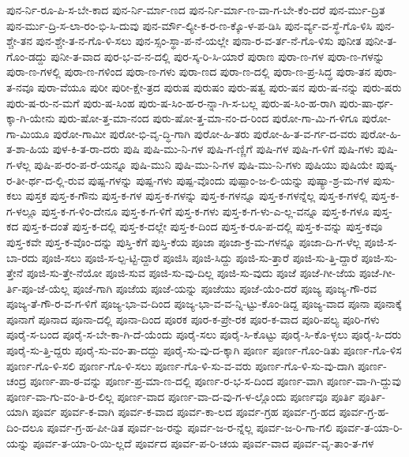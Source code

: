 {ಪುನ-ರ್ನಿ-ರೂ-ಪಿ-ಸ-ಬೇ-ಕಾದ
ಪುನ-ರ್ನಿ-ರ್ಮಾ-ಣದ
ಪುನ-ರ್ನಿ-ರ್ಮಾ-ಣ-ವಾ-ಗ-ಬೇ-ಕೆಂ-ದರೆ
ಪುನ-ರ್ಮು-ದ್ರಿತ
ಪುನ-ರ್ಮು-ದ್ರಿ-ಸ-ಲಾ-ರಂ-ಭಿ-ಸಿ-ದುವು
ಪುನ-ರ್ಮೌ-ಲ್ಯೀ-ಕ-ರ-ಣ-ಕ್ಕೊ-ಳ-ಪ-ಡಿಸಿ
ಪುನ-ರ್ವ್ಯ-ವ-ಸ್ಥೆ-ಗೊ-ಳಿಸಿ
ಪುನ-ಶ್ಚೇ-ತನ
ಪುನ-ಶ್ಚೇ-ತ-ನ-ಗೊ-ಳಿ-ಸಲು
ಪುನ-ಸ್ಸಂ-ಸ್ಥಾ-ಪ-ನೆ-ಯಲ್ಲೇ
ಪುನಾ-ರ-ವ-ರ್ತ-ನೆ-ಗೊ-ಳಿಸು
ಪುನೀತ
ಪುನೀ-ತ-ಗೊಂ-ಡದ್ದು
ಪುನೀ-ತ-ವಾದ
ಪುರ-ಭ-ವ-ನ-ದಲ್ಲಿ
ಪುರ-ಸ್ಕ-ರಿ-ಸಿ-ಯಾರೆ
ಪುರಾಣ
ಪುರಾ-ಣ-ಗಳ
ಪುರಾ-ಣ-ಗಳನ್ನು
ಪುರಾ-ಣ-ಗಳಲ್ಲಿ
ಪುರಾ-ಣ-ಗಳಿಂದ
ಪುರಾ-ಣ-ಗಳು
ಪುರಾ-ಣದ
ಪುರಾ-ಣ-ದಲ್ಲಿ
ಪುರಾ-ಣ-ಪ್ರ-ಸಿದ್ಧ
ಪುರಾ-ತನ
ಪುರಾ-ತ-ನವೂ
ಪುರಾ-ವೆಯೂ
ಪುರೀ
ಪುರೀ-ಕ್ಷೇ-ತ್ರದ
ಪುರುಷ
ಪುರುಷಂ
ಪುರು-ಷತ್ವ
ಪುರು-ಷನ
ಪುರು-ಷ-ನನ್ನು
ಪುರು-ಷರು
ಪುರು-ಷ-ರು-ನ-ಮಗೆ
ಪುರು-ಷ-ಸಿಂಹ
ಪುರು-ಷ-ಸಿಂ-ಹ-ರ-ನ್ನಾ-ಗಿ-ಸ-ಬಲ್ಲ
ಪುರು-ಷ-ಸಿಂ-ಹ-ರಾಗಿ
ಪುರು-ಷಾ-ರ್ಥ-ಕ್ಕಾ-ಗಿ-ಯೇನು
ಪುರು-ಷೋ-ತ್ತ-ಮಾ-ನಂದ
ಪುರು-ಷೋ-ತ್ತ-ಮಾ-ನಂ-ದ-ರಿಂದ
ಪುರೋ-ಗಾ-ಮಿ-ಗ-ಳಿಗೂ
ಪುರೋ-ಗಾ-ಮಿಯೂ
ಪುರೋ-ಗಾಮೀ
ಪುರೋ-ಭಿ-ವೃ-ದ್ಧಿ-ಗಾಗಿ
ಪುರೋ-ಹಿ-ತರು
ಪುರೋ-ಹಿ-ತ-ವ-ರ್ಗ-ದ-ವರು
ಪುರೋ-ಹಿ-ತ-ಶಾ-ಹಿಯ
ಪುಳ-ಕಿ-ತ-ರಾ-ದರು
ಪುಷಿ
ಪುಷಿ-ಮು-ನಿ-ಗಳ
ಪುಷಿ-ಗ-ಣ್ಣಿಗೆ
ಪುಷಿ-ಗಳ
ಪುಷಿ-ಗ-ಳಿಗೆ
ಪುಷಿ-ಗಳು
ಪುಷಿ-ಗ-ಳೆಲ್ಲ
ಪುಷಿ-ಪ-ರಂ-ಪ-ರೆ-ಯನ್ನೂ
ಪುಷಿ-ಮುನಿ
ಪುಷಿ-ಮು-ನಿ-ಗಳ
ಪುಷಿ-ಮು-ನಿ-ಗಳು
ಪುಷಿಯು
ಪುಷಿಯೇ
ಪುಷ್ಕ-ರ-ತೀ-ರ್ಥ-ದ-ಲ್ಲಿ-ರುವ
ಪುಷ್ಪ-ಗಳನ್ನು
ಪುಷ್ಪ-ಗಳು
ಪುಷ್ಪ-ವೊಂದು
ಪುಷ್ಪಾಂ-ಜ-ಲಿ-ಯನ್ನು
ಪುಷ್ಯಾ-ಶ್ರ-ಮ-ಗಳ
ಪುಸು-ಕಲು
ಪುಸ್ತಕ
ಪುಸ್ತ-ಕ-ಗೌನು
ಪುಸ್ತ-ಕ-ಗಳ
ಪುಸ್ತ-ಕ-ಗಳನ್ನು
ಪುಸ್ತ-ಕ-ಗಳನ್ನೂ
ಪುಸ್ತ-ಕ-ಗಳನ್ನೆಲ್ಲ
ಪುಸ್ತ-ಕ-ಗಳಲ್ಲಿ
ಪುಸ್ತ-ಕ-ಗ-ಳಲ್ಲೂ
ಪುಸ್ತ-ಕ-ಗ-ಳಿಂ-ದೇನೂ
ಪುಸ್ತ-ಕ-ಗ-ಳಿಗೆ
ಪುಸ್ತ-ಕ-ಗಳು
ಪುಸ್ತ-ಕ-ಗ-ಳು-ಎ-ಲ್ಲ-ವನ್ನೂ
ಪುಸ್ತ-ಕ-ಗಳೂ
ಪುಸ್ತ-ಕದ
ಪುಸ್ತ-ಕ-ದಂತೆ
ಪುಸ್ತ-ಕ-ದಲ್ಲಿ
ಪುಸ್ತ-ಕ-ದಲ್ಲೇ
ಪುಸ್ತ-ಕ-ದಿಂದ
ಪುಸ್ತ-ಕ-ರೂ-ಪ-ದಲ್ಲಿ
ಪುಸ್ತ-ಕ-ವನ್ನು
ಪುಸ್ತ-ಕವೂ
ಪುಸ್ತ-ಕವೇ
ಪುಸ್ತ-ಕ-ವೊಂ-ದನ್ನು
ಪುಸ್ತಿ-ಕೆಗೆ
ಪುಸ್ತಿ-ಕೆಯ
ಪೂಜಾ
ಪೂಜಾ-ಕ್ರ-ಮ-ಗಳನ್ನೂ
ಪೂಜಾ-ದಿ-ಗ-ಳೆಲ್ಲ
ಪೂಜಿ-ಸ-ಬಾ-ರದು
ಪೂಜಿ-ಸಲು
ಪೂಜಿ-ಸ-ಲ್ಪ-ಟ್ಟಿ-ದ್ದಾರೆ
ಪೂಜಿಸಿ
ಪೂಜಿ-ಸಿದ್ದು
ಪೂಜಿ-ಸು-ತ್ತಾರೆ
ಪೂಜಿ-ಸು-ತ್ತಿ-ದ್ದಾರೆ
ಪೂಜಿ-ಸು-ತ್ತೇನೆ
ಪೂಜಿ-ಸು-ತ್ತೇ-ನೆಯೋ
ಪೂಜಿ-ಸುವ
ಪೂಜಿ-ಸು-ವು-ದಿಲ್ಲ
ಪೂಜಿ-ಸು-ವುದು
ಪೂಜೆ
ಪೂಜೆ-ಗೀ-ಜೆಯ
ಪೂಜೆ-ಗೀ-ರ್ತಿ-ಪೂ-ಜೆ-ಯೆಲ್ಲ
ಪೂಜೆ-ಗಾಗಿ
ಪೂಜೆಯ
ಪೂಜೆ-ಯನ್ನು
ಪೂಜೆಯು
ಪೂಜೆ-ಯೆಂ-ದರೆ
ಪೂಜ್ಯ
ಪೂಜ್ಯ-ಗೌ-ರವ
ಪೂಜ್ಯ-ತೆ-ಗೌ-ರ-ವ-ಗ-ಳಿಗೆ
ಪೂಜ್ಯ-ಭಾ-ವ-ದಿಂದ
ಪೂಜ್ಯ-ಭಾ-ವ-ವ-ನ್ನಿ-ಟ್ಟು-ಕೊಂ-ಡಿದ್ದ
ಪೂಜ್ಯ-ವಾದ
ಪೂನಾ
ಪೂನಾಕ್ಕೆ
ಪೂನಾಗೆ
ಪೂನಾದ
ಪೂನಾ-ದಲ್ಲಿ
ಪೂನಾ-ದಿಂದ
ಪೂರಕ
ಪೂರ-ಕ-ಪ್ರೇ-ರಕ
ಪೂರ-ಕ-ವಾದ
ಪೂರಿ-ಪಲ್ಯ
ಪೂರಿ-ಗಳು
ಪೂರೈ-ಸ-ಬಂದ
ಪೂರೈ-ಸ-ಬೇ-ಕಾ-ಗಿ-ದೆ-ಯೆಂದು
ಪೂರೈ-ಸಲು
ಪೂರೈ-ಸಿ-ಕೊಟ್ಟು
ಪೂರೈ-ಸಿ-ಕೊ-ಳ್ಳಲು
ಪೂರೈ-ಸಿ-ದರು
ಪೂರೈ-ಸು-ತ್ತಿ-ದ್ದರು
ಪೂರೈ-ಸು-ವಂ-ತಾ-ದದ್ದು
ಪೂರೈ-ಸು-ವು-ದ-ಕ್ಕಾಗಿ
ಪೂರ್ಣ
ಪೂರ್ಣ-ಗೊಂ-ಡಿತು
ಪೂರ್ಣ-ಗೊ-ಳಿಸ
ಪೂರ್ಣ-ಗೊ-ಳಿ-ಸಲಿ
ಪೂರ್ಣ-ಗೊ-ಳಿ-ಸಲು
ಪೂರ್ಣ-ಗೊ-ಳಿ-ಸು-ವ-ವರು
ಪೂರ್ಣ-ಗೊ-ಳಿ-ಸು-ವು-ದಾಗಿ
ಪೂರ್ಣ-ಚಂದ್ರ
ಪೂರ್ಣ-ಪಾ-ಠ-ವನ್ನು
ಪೂರ್ಣ-ಪ್ರ-ಮಾ-ಣ-ದಲ್ಲಿ
ಪೂರ್ಣ-ರ-ಭ-ಸ-ದಿಂದ
ಪೂರ್ಣ-ವಾಗಿ
ಪೂರ್ಣ-ವಾ-ಗಿ-ದ್ದುವು
ಪೂರ್ಣ-ವಾ-ಗು-ವಂ-ತಿ-ರ-ಲಿಲ್ಲ
ಪೂರ್ಣ-ವಾದ
ಪೂರ್ಣ-ವಾ-ದ-ವು-ಗ-ಳ-ಲ್ಲೊಂದು
ಪೂರ್ಣವೂ
ಪೂರ್ತಿ
ಪೂರ್ತಿ-ಯಾಗಿ
ಪೂರ್ವ
ಪೂರ್ವ-ಕ-ವಾಗಿ
ಪೂರ್ವ-ಕ-ವಾದ
ಪೂರ್ವ-ಕಾ-ಲದ
ಪೂರ್ವ-ಗ್ರಹ
ಪೂರ್ವ-ಗ್ರ-ಹದ
ಪೂರ್ವ-ಗ್ರ-ಹ-ದಿಂ-ದಲೂ
ಪೂರ್ವ-ಗ್ರ-ಹ-ಪೀ-ಡಿತ
ಪೂರ್ವ-ಜ-ರನ್ನು
ಪೂರ್ವ-ಜ-ರ-ನ್ನೆಲ್ಲ
ಪೂರ್ವ-ಜ-ರಿ-ಗಾ-ಗಲಿ
ಪೂರ್ವ-ತ-ಯಾ-ರಿ-ಯನ್ನು
ಪೂರ್ವ-ತ-ಯಾ-ರಿ-ಯಿ-ಲ್ಲದೆ
ಪೂರ್ವದ
ಪೂರ್ವ-ಪ-ರಿ-ಚಯ
ಪೂರ್ವ-ವಾದ
ಪೂರ್ವ-ವೃ-ತಾಂ-ತ-ಗಳ
}
